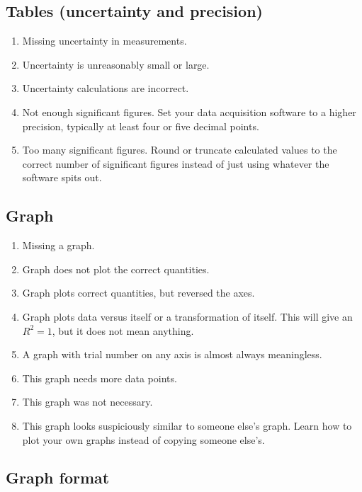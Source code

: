 \documentclass[12pt,letterpaper]{article}
\begin{document}
\begin{multicols}{2}
\subsection*{Tables (uncertainty and precision)}

\begin{enumerate}[start=70]
  \item Missing uncertainty in measurements.
  \item Uncertainty is unreasonably small or large.
  \item Uncertainty calculations are incorrect.
  \item Not enough significant figures.
    Set your data acquisition software to a higher precision,
    typically at least four or five decimal points.
  \item Too many significant figures.  Round or truncate calculated values
    to the correct number of significant figures
    instead of just using whatever the software spits out.
\end{enumerate}

\subsection*{Graph}

\begin{enumerate}[start=80]
  \item Missing a graph.
  \item Graph does not plot the correct quantities.
  \item Graph plots correct quantities, but reversed the axes.
  \item Graph plots data versus itself or a transformation of itself.
    This will give an $R^2 = 1$, but it does not mean anything.
  \item A graph with trial number on any axis
    is almost always meaningless.
  \item This graph needs more data points.
  \item This graph was not necessary.
  \item This graph looks suspiciously similar to someone else's graph.
    Learn how to plot your own graphs instead of copying someone else's.
\end{enumerate}

\subsection*{Graph format}


\end{multicols}
\end{document}

